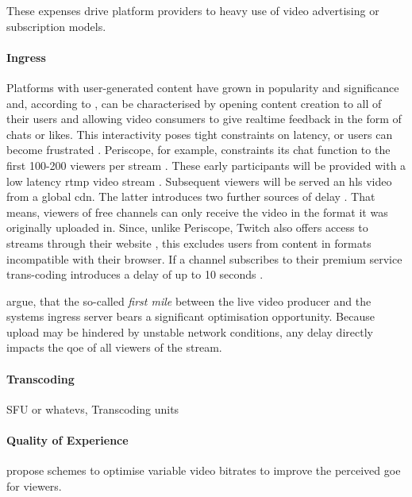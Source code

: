 These expenses drive platform providers to heavy use of video advertising or subscription models.

\paragraph{Ingress}
Platforms with user-generated content have grown in popularity and significance and, according to \citet{twitch-case}, can be characterised by opening content creation to all of their users and allowing video consumers to give realtime feedback in the form of chats or likes. This interactivity poses tight constraints on latency, or users can become frustrated \cite{TODO}. Periscope, for example, constraints its chat function to the first 100-200 viewers per stream \cite{TODO}. These early participants will be provided with a low latency \gls{rtmp} video stream \cite{TODO}. Subsequent viewers will be served an \gls{hls} video from a global \gls{cdn}. The latter introduces two further sources of delay \cite[\S2-3{periscope-experience}: 1) \gls{hls} segments the video into smaller files, so the duration of such a chunk adds to overall latency. 2) According to network analysis by \citet{periscope-experience} Periscope uses different \textit{Cloud Computing} providers for ingress and \gls{cdn} use.

Twitch, for example, reserves computationally expensive trans-coding of live streams for its premium users \cite[\S2]{twitch-study}. That means, viewers of free channels can only receive the video in the format it was originally uploaded in. Since, unlike Periscope, Twitch also offers access to streams through their website \cite{TODO}, this excludes users from content in formats incompatible with their browser. If a channel subscribes to their premium service trans-coding introduces a delay of up to 10 seconds \cite[\S4.2]{twitch-study}.

\citet[III A.]{content-harvest-network} argue, that the so-called \textit{first mile} between the live video producer and the systems ingress server bears a significant optimisation opportunity. Because upload may be hindered by unstable network conditions, any delay directly impacts the \gls{qoe} of all viewers of the stream.

\paragraph{Transcoding}
SFU or whatevs, Transcoding units

\paragraph{Quality of Experience}
\citet*{personalized-live-streaming-experience} propose schemes to optimise variable video bitrates to improve the perceived \gls{goe} for viewers.

